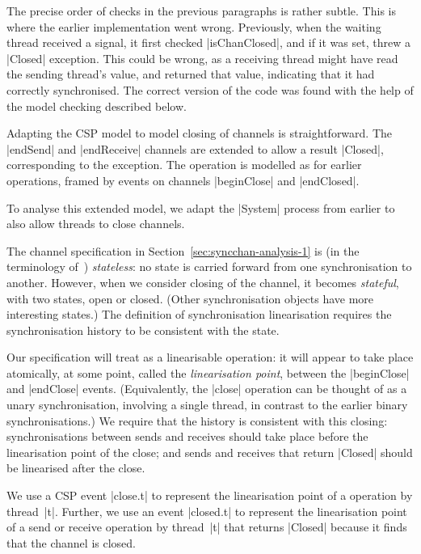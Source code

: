 The precise order of checks in the previous paragraphs is rather subtle.  This
is where the earlier implementation went wrong.  Previously, when the waiting
thread received a signal, it first checked |isChanClosed|, and if it was set,
threw a |Closed| exception.  This could be wrong, as a receiving thread might
have read the sending thread's value, and returned that value, indicating that
it had correctly synchronised.  The correct version of the code was found with
the help of the model checking described below. 


\inlineCSP

Adapting the CSP model to model closing of channels is straightforward.  The
|endSend| and |endReceive| channels are extended to allow a result |Closed|,
corresponding to the  exception.  The  operation is
modelled as for earlier operations, framed by events on channels |beginClose|
and |endClosed|.


To analyse this extended model, we adapt the |System| process from earlier to
also allow threads to close channels.  

The channel specification in Section~\ref{sec:syncchan-analysis-1} is (in the
terminology of~\cite{LL:synchronisation}) \emph{stateless}: no state is
carried forward from one synchronisation to another.  However, when we
consider closing of the channel, it becomes \emph{stateful}, with two states,
open or closed.  (Other synchronisation objects have more interesting states.)
The definition of synchronisation linearisation requires the synchronisation
history to be consistent with the state. 

Our specification will treat  as a linearisable operation: it
will appear to take place atomically, at some point, called the
\emph{linearisation point}, between the |beginClose| and |endClose| events.
(Equivalently, the |close| operation can be thought of as a unary
synchronisation, involving a single thread, in contrast to the earlier binary
synchronisations.)  We require that the history is consistent with this
closing: synchronisations between sends and receives should take place before
the linearisation point of the close; and sends and receives that return
|Closed| should be linearised after the close.

We use a CSP event |close.t| to represent the linearisation point of a
 operation by thread~|t|.  Further, we use an event |closed.t| to
represent the linearisation point of a send or receive operation by thread~|t|
that returns |Closed| because it finds that the channel is closed.

